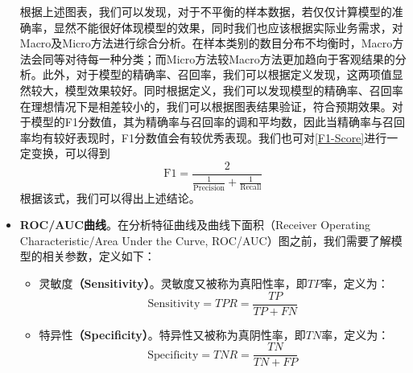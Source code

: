 \documentclass{MathorCupmodeling}
\begin{document}
\begin{itemize}
		\begin{table}[htbp]
			\centering
			\caption{模型一宏观、微观、权重计算准确率、召回率、F1分数值}
			\setlength{\aboverulesep}{0pt}
			\setlength{\belowrulesep}{0pt}
			\label{tab:MacroMicroWeighted}
		\end{table}
		根据上述图表，我们可以发现，对于不平衡的样本数据，若仅仅计算模型的准确率，显然不能很好体现模型的效果，同时我们也应该根据实际业务需求，对Macro及Micro方法进行综合分析。在样本类别的数目分布不均衡时，Macro方法会同等对待每一种分类；而Micro方法较Macro方法更加趋向于客观结果的分析。此外，对于模型的精确率、召回率，我们可以根据定义发现，这两项值显然较大，模型效果较好。同时根据定义，我们可以发现模型的精确率、召回率在理想情况下是相差较小的，我们可以根据图表结果验证，符合预期效果。对于模型的F1分数值，其为精确率与召回率的调和平均数，因此当精确率与召回率均有较好表现时，F1分数值会有较优秀表现。我们也可对\textcolor{blue}{\eqref{F1-Score}}进行一定变换，可以得到
		\begin{equation}
			\mathrm{F}1=\frac{2}{\frac{1}{\mathrm{Precision}}+\frac{1}{\mathrm{Recall}}} \label{ReacllNew}
		\end{equation}
		根据该式，我们可以得出上述结论。
		\item \textbf{ROC/AUC曲线}。在分析特征曲线及曲线下面积（Receiver Operating Characteristic/Area Under the Curve, ROC/AUC）图之前，我们需要了解模型的相关参数，定义如下：
		\begin{itemize}
			\item {\heiti 灵敏度}\textbf{（Sensitivity）}。灵敏度又被称为真阳性率，即$TP$率，定义为：
			\begin{equation}
				\mathrm{Sensitivity}=TPR=\frac{TP}{TP+FN} \label{Sensitivity}
			\end{equation}
			\item {\heiti 特异性}\textbf{（Specificity）}。特异性又被称为真阴性率，即$TN$率，定义为：
			\begin{equation}
				\mathrm{Specificity}=TNR=\frac{TN}{TN+FP} \label{Specificity}
			\end{equation}

\end{itemize}
\end{itemize}
\end{document}
